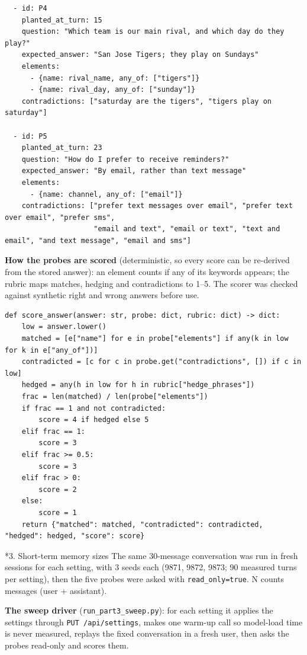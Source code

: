 \documentclass[11pt]{article}
\makeatletter
\renewcommand\subsection{\@startsection{subsection}{2}{\z@}{-2.2ex \@plus -1ex \@minus -.2ex}{0.8ex \@plus.2ex}{\normalfont\fontsize{12}{14.5}\selectfont\bfseries}}
\makeatother
\begin{document}
\begin{lstlisting}
  - id: P4
    planted_at_turn: 15
    question: "Which team is our main rival, and which day do they play?"
    expected_answer: "San Jose Tigers; they play on Sundays"
    elements:
      - {name: rival_name, any_of: ["tigers"]}
      - {name: rival_day, any_of: ["sunday"]}
    contradictions: ["saturday are the tigers", "tigers play on saturday"]

  - id: P5
    planted_at_turn: 23
    question: "How do I prefer to receive reminders?"
    expected_answer: "By email, rather than text message"
    elements:
      - {name: channel, any_of: ["email"]}
    contradictions: ["prefer text messages over email", "prefer text over email", "prefer sms",
                     "email and text", "email or text", "text and email", "and text message", "email and sms"]
\end{lstlisting}
\endgroup
\textbf{How the probes are scored} (deterministic, so every score can be re-derived from the stored answer): an element counts if any of its keywords appears; the rubric maps matches, hedging and contradictions to 1--5. The scorer was checked against synthetic right and wrong answers before use.

\begingroup\lstset{basicstyle=\ttfamily\scriptsize}
\begin{lstlisting}
def score_answer(answer: str, probe: dict, rubric: dict) -> dict:
    low = answer.lower()
    matched = [e["name"] for e in probe["elements"] if any(k in low for k in e["any_of"])]
    contradicted = [c for c in probe.get("contradictions", []) if c in low]
    hedged = any(h in low for h in rubric["hedge_phrases"])
    frac = len(matched) / len(probe["elements"])
    if frac == 1 and not contradicted:
        score = 4 if hedged else 5
    elif frac == 1:
        score = 3
    elif frac >= 0.5:
        score = 3
    elif frac > 0:
        score = 2
    else:
        score = 1
    return {"matched": matched, "contradicted": contradicted, "hedged": hedged, "score": score}
\end{lstlisting}
\endgroup
\subsection*{3. Short-term memory sizes}
The same 30-message conversation was run in fresh sessions for each setting, with 3 seeds each (9871, 9872, 9873; 90 measured turns per setting), then the five probes were asked with \verb|read_only=true|. N counts messages (user + assistant).

\textbf{The sweep driver} (\verb|run_part3_sweep.py|): for each setting it applies the settings through \verb|PUT /api/settings|, makes one warm-up call so model-load time is never measured, replays the fixed conversation in a fresh user, then asks the probes read-only and scores them.
\end{document}
